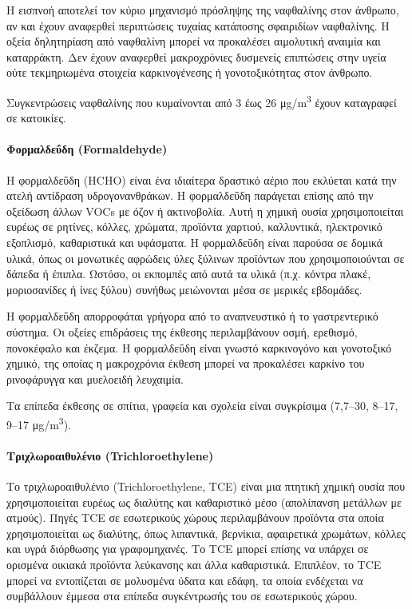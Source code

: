 Η εισπνοή αποτελεί τον κύριο μηχανισμό πρόσληψης της ναφθαλίνης στον άνθρωπο, αν και έχουν αναφερθεί περιπτώσεις τυχαίας κατάποσης σφαιριδίων ναφθαλίνης. Η οξεία δηλητηρίαση από ναφθαλίνη μπορεί να προκαλέσει αιμολυτική αναιμία και καταρράκτη. Δεν έχουν αναφερθεί μακροχρόνιες δυσμενείς επιπτώσεις στην υγεία ούτε τεκμηριωμένα στοιχεία καρκινογένεσης ή γονοτοξικότητας στον άνθρωπο.

Συγκεντρώσεις ναφθαλίνης που κυμαίνονται από 3 έως 26 μg/m\textsuperscript{3} έχουν καταγραφεί σε κατοικίες.


\paragraph{Φορμαλδεΰδη (Formaldehyde)}

Η φορμαλδεΰδη (HCHO) είναι ένα ιδιαίτερα δραστικό αέριο που εκλύεται κατά την ατελή αντίδραση υδρογονανθράκων. Η φορμαλδεΰδη παράγεται επίσης από την οξείδωση άλλων VOCs με όζον ή ακτινοβολία. Αυτή η χημική ουσία χρησιμοποιείται ευρέως σε ρητίνες, κόλλες, χρώματα, προϊόντα χαρτιού, καλλυντικά, ηλεκτρονικό εξοπλισμό, καθαριστικά και υφάσματα. Η φορμαλδεΰδη είναι παρούσα σε δομικά υλικά, όπως οι μονωτικές αφρώδεις ύλες ξύλινων προϊόντων που χρησιμοποιούνται σε δάπεδα ή έπιπλα. Ωστόσο, οι εκπομπές από αυτά τα υλικά (π.χ. κόντρα πλακέ, μοριοσανίδες ή ίνες ξύλου) συνήθως μειώνονται μέσα σε μερικές εβδομάδες.

Η φορμαλδεΰδη απορροφάται γρήγορα από το αναπνευστικό ή το γαστρεντερικό σύστημα. Οι οξείες επιδράσεις της έκθεσης περιλαμβάνουν οσμή, ερεθισμό, πονοκέφαλο και έκζεμα. Η φορμαλδεΰδη είναι γνωστό καρκινογόνο και γονοτοξικό χημικό, της οποίας η μακροχρόνια έκθεση μπορεί να προκαλέσει καρκίνο του ρινοφάρυγγα και μυελοειδή λευχαιμία.

Τα επίπεδα έκθεσης σε σπίτια, γραφεία και σχολεία είναι συγκρίσιμα (7,7–30, 8–17, 9–17 μg/m\textsuperscript{3}).


\paragraph{Τριχλωροαιθυλένιο (Trichloroethylene)}

Το τριχλωροαιθυλένιο (Trichloroethylene, TCE) είναι μια πτητική χημική ουσία που χρησιμοποιείται ευρέως ως διαλύτης και καθαριστικό μέσο (απολίπανση μετάλλων με ατμούς). Πηγές TCE σε εσωτερικούς χώρους περιλαμβάνουν προϊόντα στα οποία χρησιμοποιείται ως διαλύτης, όπως λιπαντικά, βερνίκια, αφαιρετικά χρωμάτων, κόλλες και υγρά διόρθωσης για γραφομηχανές. Το TCE μπορεί επίσης να υπάρχει σε ορισμένα οικιακά προϊόντα λεύκανσης και άλλα καθαριστικά. Επιπλέον, το TCE μπορεί να εντοπίζεται σε μολυσμένα ύδατα και εδάφη, τα οποία ενδέχεται να συμβάλλουν έμμεσα στα επίπεδα συγκέντρωσής του σε εσωτερικούς χώρου.

